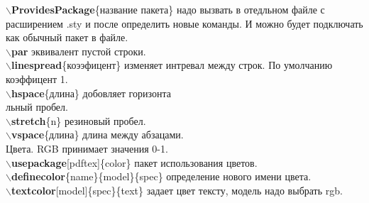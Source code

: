 \documentclass{article}
\newcommand{\bs}{$\backslash$}
\newcommand{\bd}[1]{{\bfseries #1}} %
\newcommand{\bb}[1]{\bd{\bs #1}} %
\begin{document}
\bb{ProvidesPackage}\{название пакета\} надо вызвать в отедльном файле
с расширением .sty и после определить новые команды.
И можно будет подключать как обычный пакет в файле.\\

\bb{par} эквивалент пустой строки.\\

\bb{linespread}\{коээфицент\} изменяет интревал между строк.
По умолчанию коэффицент 1.\\
\bb{hspace}\{длина\} добовляет горизонта\\льный пробел.\\
\bb{stretch}\{n\} резиновый пробел.\\
\bb{vspace}\{длина\} длина между абзацами.\\

Цвета. RGB принимает значения 0-1.\\
\bb{usepackage}[pdftex]\{color\} пакет использования цветов.\\
\bb{definecolor}\{name\}\{model\}\{spec\} определение нового имени цвета.\\
\bb{textcolor}[model]\{spec\}\{text\}
\textcolor[rgb]{1,0,0}{задает цвет тексту, модель надо выбрать rgb.}\\
\end{document}
